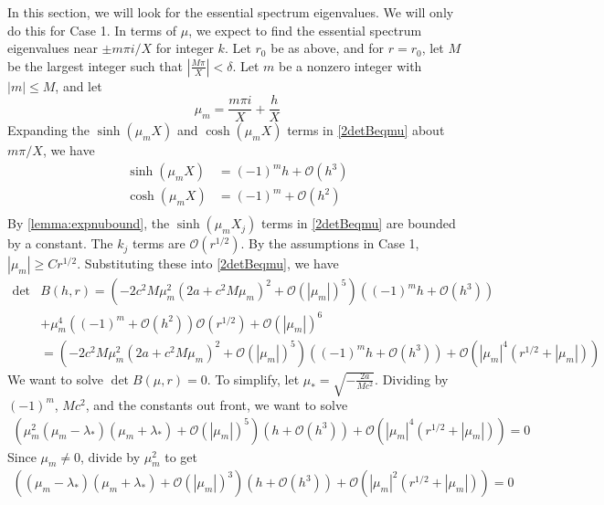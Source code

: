 \documentclass[thesis.tex]{subfiles}
\begin{document}
In this section, we will look for the essential spectrum eigenvalues. We will only do this for Case 1. In terms of $\mu$, we expect to find the essential spectrum eigenvalues near $\pm m \pi i/X$ for integer $k$. Let $r_0$ be as above, and for $r = r_0$, let $M$ be the largest integer such that $\left| \frac{M \pi}{X} \right| < \delta$. Let $m$ be a nonzero integer with $|m| \leq M$, and let
\[
\mu_m = \frac{m \pi i}{X} + \frac{h}{X}
\]
Expanding the $\sinh(\mu_m X)$ and $\cosh(\mu_m X)$ terms in \cref{2detBeqmu} about $m \pi/X$, we have
\begin{align*}
\sinh(\mu_m X) &= (-1)^m h + \mathcal{O}(h^3) \\
\cosh(\mu_m X) &= (-1)^m + \mathcal{O}(h^2) \\
\end{align*}
By \cref{lemma:expnubound}, the $\sinh(\mu_m X_j)$ terms in \cref{2detBeqmu} are bounded by a constant. The $k_j$ terms are $\mathcal{O}(r^{1/2})$. By the assumptions in Case 1, $|\mu_m| \geq C r^{1/2}$. Substituting these into \cref{2detBeqmu}, we have 
\begin{equation}\label{Bess1}
\begin{aligned}
\det &B(h, r) = \left(-2 c^2 M  \mu_m^2 \left( 2a + c^2 M \mu_m \right)^2 + \mathcal{O}( |\mu_m|)^5 \right) \left( (-1)^m h + \mathcal{O}(h^3) \right) \\
&+ \mu_m^4 \left( (-1)^m + \mathcal{O}(h^2)\right)\mathcal{O}(r^{1/2}) + \mathcal{O}\left( |\mu_m| \right)^6 \\
&= \left(-2 c^2 M  \mu_m^2 \left( 2a + c^2 M \mu_m \right)^2 + \mathcal{O}( |\mu_m|)^5 \right) \left( (-1)^m h + \mathcal{O}(h^3) \right) + \mathcal{O}\left( |\mu_m|^4(r^{1/2} + |\mu_m|) \right)
\end{aligned}
\end{equation}
We want to solve $\det B(\mu, r) = 0$. To simplify, let $\mu_* = \sqrt{-\frac{2a}{M c^2}}$. Dividing by $(-1)^m$, $M c^2$, and the constants out front, we want to solve 
\begin{equation}\label{Bess2}
\begin{aligned}
\left(\mu_m^2 (\mu_m - \lambda_*)(\mu_m + \lambda_*) + \mathcal{O}( |\mu_m|)^5 \right) \left( h + \mathcal{O}(h^3) \right) + \mathcal{O}\left( |\mu_m|^4(r^{1/2} + |\mu_m|) \right) = 0
\end{aligned}
\end{equation}
Since $\mu_m \neq 0$, divide by $\mu_m^2$ to get
\begin{equation}\label{Bess3}
\begin{aligned}
\left((\mu_m - \lambda_*)(\mu_m + \lambda_*) + \mathcal{O}( |\mu_m|)^3 \right) \left( h + \mathcal{O}(h^3) \right) + \mathcal{O}\left( |\mu_m|^2(r^{1/2} + |\mu_m|) \right) = 0
\end{aligned}
\end{equation}
\end{document}
